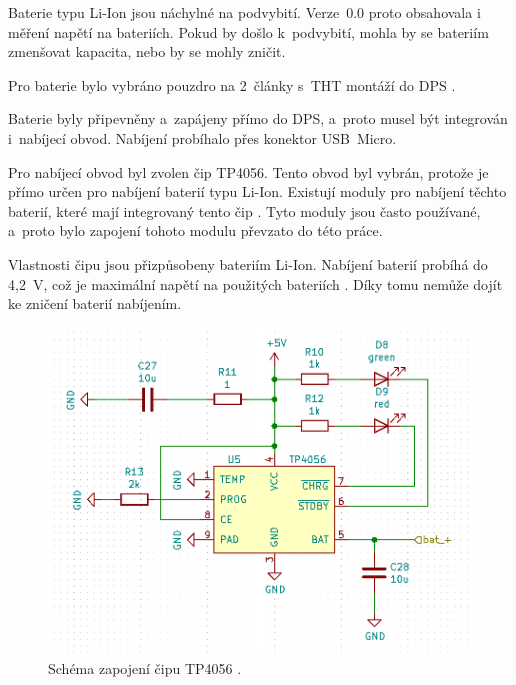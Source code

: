   Baterie typu Li-Ion jsou náchylné na podvybití. Verze~0.0 proto obsahovala i měření napětí na bateriích. Pokud by došlo k~podvybití, mohla 
  by se bateriím zmenšovat kapacita, nebo by se mohly zničit. 

  Pro baterie bylo vybráno pouzdro na 2~články s~THT montáží do DPS \cite{18650_pouzdro}.

  Baterie byly připevněny a~zapájeny přímo do DPS, a~proto musel být integrován i~nabíjecí obvod. Nabíjení probíhalo přes konektor USB~Micro.

  Pro nabíjecí obvod byl zvolen čip TP4056. Tento obvod byl vybrán, protože je přímo určen pro nabíjení baterií typu Li-Ion. Existují 
  moduly pro nabíjení těchto baterií, které mají integrovaný tento čip \cite{Nabijeci_modul}. Tyto moduly jsou často používané, a~proto 
  bylo zapojení tohoto modulu převzato do této práce. 

  Vlastnosti čipu jsou přizpůsobeny bateriím Li-Ion. Nabíjení baterií probíhá do 4,2~V, což je maximální napětí na použitých 
  bateriích \cite{18650} \cite{TP4056_datasheet}. Díky tomu nemůže dojít ke zničení baterií nabíjením.

  \begin{figure}[!h]
    \begin{center}
      \includegraphics[scale=0.6]{obrazky/TP4056_schema.png}
    \end{center}
    \caption[Schéma zapojení čipu TP4056 \cite{TP4056_datasheet}]{Schéma zapojení čipu TP4056 \cite{TP4056_datasheet}.}
  \end{figure}

